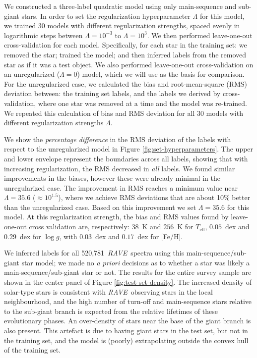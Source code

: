 \documentclass[preprint]{aastex}
\newcommand{\acronym}[1]{{\small{#1}}}
\newcommand{\project}[1]{\textsl{#1}}
\newcommand{\rave}{\project{\acronym{RAVE}}}
\newcommand{\teff}{T_{\mathrm{eff}}}
\newcommand{\logg}{\log g}
\newcommand{\Nspectra}{520,781}
\begin{document}
We constructed a three-label quadratic model using only main-sequence and sub-giant
stars. In order to set the regularization hyperparameter $\Lambda$ for this model, we 
trained 30 models with different regularization strengths, spaced evenly in logarithmic
steps between $\Lambda = 10^{-3}$ to $\Lambda = 10^{3}$.  We then performed leave-one-out 
cross-validation for each model.  Specifically, for each star in the training set: we 
removed the star; trained the model; and then inferred labels from the removed star as 
if it was a test object.  We also performed leave-one-out cross-validation on an 
unregularized ($\Lambda = 0$) model, which we will use as the basis for comparison.  
For the unregularized case, we calculated the bias and root-mean-square (RMS) deviation 
between: the training set labels, and the labels we derived by cross-validation, where 
one star was removed at a time and the model was re-trained.  We repeated this calculation
of bias and RMS deviation for all 30 models with different regularization strengths $\Lambda$. 


We show the \emph{percentage difference} in the RMS deviation of the labels with respect
to the unregularized model in Figure \ref{fig:set-hyperparameters}.  The upper 
and lower envelope represent the boundaries across all labels, showing that with increasing
regularization, the RMS decreased in \emph{all} labels.  We found similar
improvements in the biases, however these were already minimal in the unregularized
case.  The improvement in RMS reaches a minimum value near 
$\Lambda = 35.6$ ($\approx10^{1.5}$), where
we achieve RMS deviations that are about 10\% better than the unregularized case.
Based on this improvement we set $\Lambda = 35.6$ for this model.  At this regularization 
strength, the bias and RMS values found by leave-one-out
cross validation are, respectively: $38$~K and $256$~K for $\teff$, $0.05$~dex and 
$0.29$~dex for $\logg$, with $0.03$~dex and $0.17$~dex for [Fe/H].


We inferred labels for all \Nspectra\ \rave\ spectra using this main-sequence/sub-giant
star model; we made no \emph{a priori} decisions as to whether a star was likely a
main-sequence/sub-giant star or not.  The results for the entire survey sample are shown
in the center panel of Figure \ref{fig:test-set-density}.  The increased density of 
solar-type stars is consistent with \rave\ observing stars in the local neighbourhood, 
and the high number of turn-off and main-sequence stars relative to the sub-giant branch 
is expected from the relative lifetimes of these evolutionary phases.  An over-density
of stars near the base of the giant branch is also present.  This artefact is due 
to having giant stars in the test set, but not in the training set, and the model is 
(poorly) extrapolating outside the convex hull of the training set.
\end{document}

